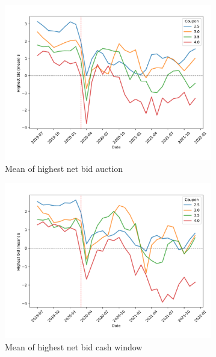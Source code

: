 \documentclass[11pt,a4paper]{article}
\begin{document}
\begin{figure}[]
\begin{subfigure}[b]{0.49\textwidth}
      \includegraphics[width=0.998\textwidth]{../results/figures/winner_bid_mean_mat30_loan1_timeseries_cpmonthly_2.5_4_auction_netbid.pdf}
      \caption{ Mean of highest net bid auction}
     \end{subfigure}
     \begin{subfigure}[b]{0.49\textwidth}
      \includegraphics[width=0.998\textwidth]{../results/figures/winner_bid_mean_mat30_loan1_timeseries_cpmonthly_2.5_4_cash_window_netbid.pdf}
      \caption{ Mean of highest net bid cash window}
     \end{subfigure}
     \begin{subfigure}[b]{0.49\textwidth}

\end{subfigure}
\end{figure}
\end{document}
